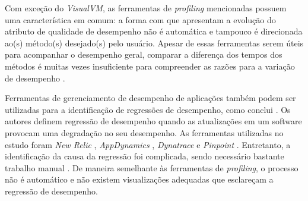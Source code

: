 Com exceção do \textit{VisualVM}, as ferramentas de \textit{profiling} mencionadas possuem uma característica em comum: a forma com que apresentam a evolução do atributo de qualidade de desempenho não é automática e tampouco é direcionada ao(s) método(s) desejado(s) pelo usuário. Apesar de essas ferramentas serem úteis para acompanhar o desempenho geral, comparar a diferença dos tempos dos métodos é muitas vezes insuficiente para compreender as razões para a variação de desempenho \cite{SandovalAlcocer2013}.



Ferramentas de gerenciamento de desempenho de aplicações também podem ser utilizadas para a identificação de regressões de desempenho, como conclui \citeauthor{Ahmed2016}. Os autores definem regressão de desempenho quando as atualizações em um software provocam uma degradação no seu desempenho. As ferramentas utilizadas no estudo foram \textit{New Relic} \cite{Relic2016}, \textit{AppDynamics} \cite{Appdynamics}, \textit{Dynatrace} \cite{Dynatrace2016} e \textit{Pinpoint} \cite{Pinpoint2016}. Entretanto, a identificação da causa da regressão foi complicada, sendo necessário bastante trabalho manual \cite{Ahmed2016}. De maneira semelhante às ferramentas de \textit{profiling}, o processo não é automático e não existem visualizações adequadas que esclareçam a regressão de desempenho.

